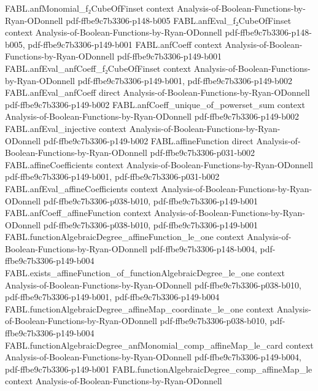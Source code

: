 \begin{theorem}
\proofstep
  {FABL.anfMonomial_f₂CubeOfFinset}
  {context}
  {Analysis-of-Boolean-Functions-by-Ryan-ODonnell}
  {pdf-ffbe9c7b3306-p148-b005}
\proofstep
  {FABL.anfEval_f₂CubeOfFinset}
  {context}
  {Analysis-of-Boolean-Functions-by-Ryan-ODonnell}
  {pdf-ffbe9c7b3306-p148-b005,
    pdf-ffbe9c7b3306-p149-b001}
\proofstep
  {FABL.anfCoeff}
  {context}
  {Analysis-of-Boolean-Functions-by-Ryan-ODonnell}
  {pdf-ffbe9c7b3306-p149-b001}
\proofstep
  {FABL.anfEval_anfCoeff_f₂CubeOfFinset}
  {context}
  {Analysis-of-Boolean-Functions-by-Ryan-ODonnell}
  {pdf-ffbe9c7b3306-p149-b001,
    pdf-ffbe9c7b3306-p149-b002}
\proofstep
  {FABL.anfEval_anfCoeff}
  {direct}
  {Analysis-of-Boolean-Functions-by-Ryan-ODonnell}
  {pdf-ffbe9c7b3306-p149-b002}
\proofstep
  {FABL.anfCoeff_unique_of_powerset_sum}
  {context}
  {Analysis-of-Boolean-Functions-by-Ryan-ODonnell}
  {pdf-ffbe9c7b3306-p149-b002}
\proofstep
  {FABL.anfEval_injective}
  {context}
  {Analysis-of-Boolean-Functions-by-Ryan-ODonnell}
  {pdf-ffbe9c7b3306-p149-b002}
\proofstep
  {FABL.affineFunction}
  {direct}
  {Analysis-of-Boolean-Functions-by-Ryan-ODonnell}
  {pdf-ffbe9c7b3306-p031-b002}
\proofstep
  {FABL.affineCoefficients}
  {context}
  {Analysis-of-Boolean-Functions-by-Ryan-ODonnell}
  {pdf-ffbe9c7b3306-p149-b001,
    pdf-ffbe9c7b3306-p031-b002}
\proofstep
  {FABL.anfEval_affineCoefficients}
  {context}
  {Analysis-of-Boolean-Functions-by-Ryan-ODonnell}
  {pdf-ffbe9c7b3306-p038-b010,
    pdf-ffbe9c7b3306-p149-b001}
\proofstep
  {FABL.anfCoeff_affineFunction}
  {context}
  {Analysis-of-Boolean-Functions-by-Ryan-ODonnell}
  {pdf-ffbe9c7b3306-p038-b010,
    pdf-ffbe9c7b3306-p149-b001}
\proofstep
  {FABL.functionAlgebraicDegree_affineFunction_le_one}
  {context}
  {Analysis-of-Boolean-Functions-by-Ryan-ODonnell}
  {pdf-ffbe9c7b3306-p148-b004,
    pdf-ffbe9c7b3306-p149-b004}
\proofstep
  {FABL.exists_affineFunction_of_functionAlgebraicDegree_le_one}
  {context}
  {Analysis-of-Boolean-Functions-by-Ryan-ODonnell}
  {pdf-ffbe9c7b3306-p038-b010,
    pdf-ffbe9c7b3306-p149-b001,
    pdf-ffbe9c7b3306-p149-b004}
\proofstep
  {FABL.functionAlgebraicDegree_affineMap_coordinate_le_one}
  {context}
  {Analysis-of-Boolean-Functions-by-Ryan-ODonnell}
  {pdf-ffbe9c7b3306-p038-b010,
    pdf-ffbe9c7b3306-p149-b004}
\proofstep
  {FABL.functionAlgebraicDegree_anfMonomial_comp_affineMap_le_card}
  {context}
  {Analysis-of-Boolean-Functions-by-Ryan-ODonnell}
  {pdf-ffbe9c7b3306-p149-b004,
    pdf-ffbe9c7b3306-p149-b001}
\proofstep
  {FABL.functionAlgebraicDegree_comp_affineMap_le}
  {context}
  {Analysis-of-Boolean-Functions-by-Ryan-ODonnell}

\end{theorem}
